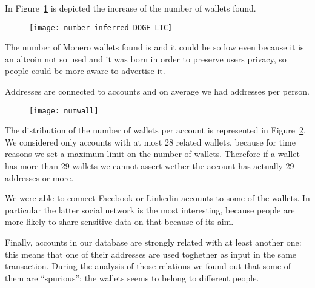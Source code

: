 In Figure~\ref{fig:dogeltcclustered} is depicted the increase of the number of
wallets found.
\begin{figure}
\centering
\texttt{[image: number\_inferred\_DOGE\_LTC]}
\label{fig:dogeltcclustered}
\end{figure}

The number of Monero wallets found is \startingXMR{} and it could
be so low even because it is an altcoin not so used and it was born in order
to preserve users privacy, so people could be more aware to advertise it.

Addresses are connected to \accountNumber{} accounts and on average we had
\avarageAccount{} addresses per person.
\begin{figure}
\centering
\texttt{[image: numwall]}
\label{fig:numwall}
\end{figure}
The distribution of the number of wallets per account is represented in
Figure~\ref{fig:numwall}. We considered only accounts with at most 28 related
wallets, because for time reasons we set a maximum limit on the number of
wallets. Therefore if a wallet has more than 29 wallets we cannot assert wether
the account has actually 29 addresses or more.

We were able to connect Facebook or Linkedin accounts to some of the wallets.
In particular the latter social network is the most interesting, because people
are more likely to share sensitive data on that because of its aim. 

Finally, \accountRelated{} accounts in our database are strongly related with
at least another one: this means that one of their addresses are used toghether
as input in the same transaction. During the analysis of those relations we
found out that some of them are ``spurious'': the wallets seems to belong to
different people.
